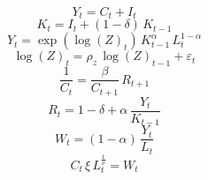 \noindent[name= `Goods market clearing']
\begin{dmath}
{Y}_{t}={C}_{t}+{I}_{t}
\end{dmath}
\noindent[name= `Capital dynamics']
\begin{dmath}
{K}_{t}={I}_{t}+\left(1-{\delta}\right)\, {K}_{t-1}
\end{dmath}
\noindent[name= `Production function']
\begin{dmath}
{Y}_{t}=\exp\left({\log(Z)}_{t}\right)\, {K}_{t-1}^{{\alpha}}\, {L}_{t}^{1-{\alpha}}
\end{dmath}
\noindent[name= `Productivity process']
\begin{dmath}
{\log(Z)}_{t}={\rho_z}\, {\log(Z)}_{t-1}+{\varepsilon}_{t}
\end{dmath}
\noindent[name= `Euler equation']
\begin{dmath}
\frac{1}{{C}_{t}}=\frac{{\beta}}{{C}_{t+1}}\, {R}_{t+1}
\end{dmath}
\noindent[name= `Return on capital']
\begin{dmath}
{R}_{t}=1-{\delta}+{\alpha}\, \frac{{Y}_{t}}{{K}_{t-1}}
\end{dmath}
\noindent[name= `Wage']
\begin{dmath}
{W}_{t}=\left(1-{\alpha}\right)\, \frac{{Y}_{t}}{{L}_{t}}
\end{dmath}
\noindent[name= `Labor equation']
\begin{dmath}
{C}_{t}\, {\xi}\, {L}_{t}^{\frac{1}{{\nu}}}={W}_{t}
\end{dmath}
